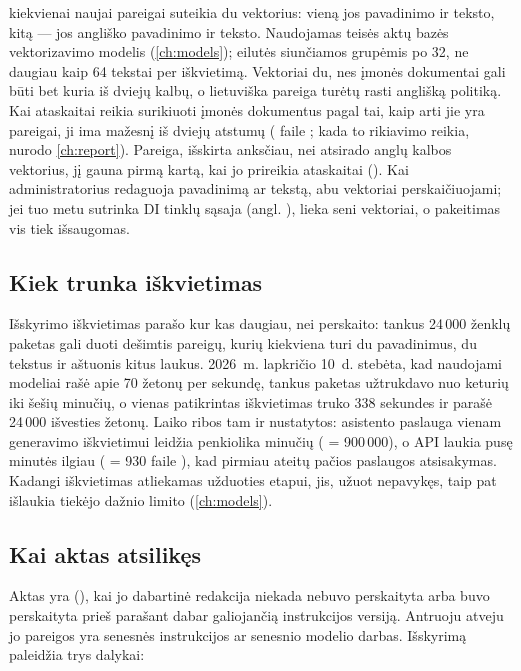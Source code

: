  kiekvienai naujai pareigai suteikia du vektorius: vieną jos pavadinimo
ir teksto, kitą --- jos angliško pavadinimo ir teksto. Naudojamas teisės aktų bazės
vektorizavimo modelis (\cref{ch:models}); eilutės siunčiamos grupėmis po 32, ne daugiau kaip 64
tekstai per iškvietimą. Vektoriai du, nes įmonės dokumentai gali būti bet kuria iš dviejų kalbų,
o lietuviška pareiga turėtų rasti anglišką politiką. Kai ataskaitai reikia surikiuoti įmonės
dokumentus pagal tai, kaip arti jie yra pareigai, ji ima mažesnį iš dviejų atstumų
( faile ; kada to rikiavimo reikia, nurodo
\cref{ch:report}). Pareiga, išskirta anksčiau, nei atsirado anglų kalbos vektorius, jį gauna
pirmą kartą, kai jo prireikia ataskaitai (). Kai administratorius redaguoja
pavadinimą ar tekstą, abu vektoriai perskaičiuojami; jei tuo metu sutrinka DI tinklų sąsaja
(angl. ), lieka seni vektoriai, o pakeitimas vis tiek išsaugomas.

\subsection{Kiek trunka iškvietimas}

Išskyrimo iškvietimas parašo kur kas daugiau, nei perskaito: tankus 24\,000 ženklų paketas gali
duoti dešimtis pareigų, kurių kiekviena turi du pavadinimus, du tekstus ir aštuonis kitus laukus.
2026~m. lapkričio 10~d. stebėta, kad naudojami modeliai rašė apie 70 žetonų per sekundę, tankus
paketas užtrukdavo nuo keturių iki šešių minučių, o vienas patikrintas iškvietimas truko 338
sekundes ir parašė 24\,000 išvesties žetonų. Laiko ribos tam ir nustatytos: asistento paslauga
vienam generavimo iškvietimui leidžia penkiolika minučių ( =
900\,000), o API laukia pusę minutės ilgiau ( = 930 faile
), kad pirmiau ateitų pačios paslaugos atsisakymas. Kadangi
iškvietimas atliekamas užduoties etapui, jis, užuot nepavykęs, taip pat išlaukia tiekėjo dažnio
limito (\cref{ch:models}).

\subsection{Kai aktas atsilikęs}\label{sec:obligations:behind}

Aktas yra  (), kai jo dabartinė redakcija niekada nebuvo
perskaityta arba buvo perskaityta prieš parašant dabar galiojančią instrukcijos versiją. Antruoju
atveju jo pareigos yra senesnės instrukcijos ar senesnio modelio darbas. Išskyrimą paleidžia trys
dalykai:

